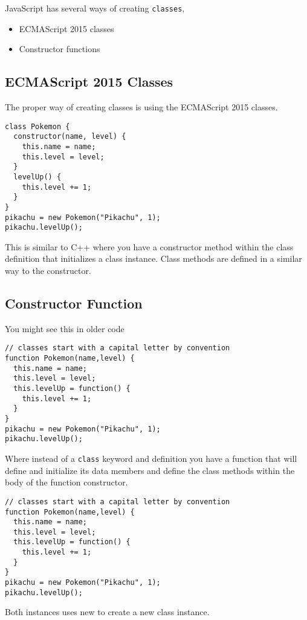 \documentclass[../CMPUT-404-Notes.tex]{subfiles}
\begin{document}
JavaScript has several ways of creating \texttt{classes},
\begin{itemize}
    \item ECMAScript 2015 classes
    \item Constructor functions 
\end{itemize}

\subsection{ECMAScript 2015 Classes}
The proper way of creating classes is using the ECMAScript 2015 classes.

\begin{verbatim}
class Pokemon {
  constructor(name, level) {
    this.name = name;
    this.level = level;
  }
  levelUp() {
    this.level += 1;
  }
}
pikachu = new Pokemon("Pikachu", 1);
pikachu.levelUp();
\end{verbatim}

This is similar to C++ where you have a constructor method within the class definition that initializes a class instance.
Class methods are defined in a similar way to the constructor.

\subsection{Constructor Function}  
You might see this in older code
\begin{verbatim}
// classes start with a capital letter by convention
function Pokemon(name,level) {
  this.name = name;
  this.level = level;
  this.levelUp = function() {
    this.level += 1;
  }
}
pikachu = new Pokemon("Pikachu", 1);
pikachu.levelUp();
\end{verbatim}
Where instead of a \texttt{class} keyword and definition you have a function that will define and initialize its data members and define the class methods within the body of the function constructor.

\begin{verbatim}
// classes start with a capital letter by convention
function Pokemon(name,level) {
  this.name = name;
  this.level = level;
  this.levelUp = function() {
    this.level += 1;
  }
}
pikachu = new Pokemon("Pikachu", 1);
pikachu.levelUp();
\end{verbatim}

Both instances uses new to create a new class instance.
\end{document}
